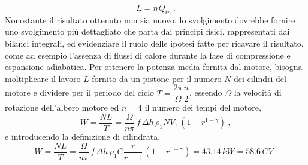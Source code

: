 \begin{equation}
  L = \eta \, Q_{in} \ .
\end{equation}
Nonostante il risultato ottenuto non sia nuovo, lo svolgimento dovrebbe fornire uno svolgimento più dettagliato che parta dai principi fisici, rappresentati dai bilanci integrali, ed evidenziare il ruolo delle ipotesi fatte per ricavare il risultato, come ad esempio l'assenza di flussi di calore durante la fase di compressione e espansione adiabatica. 
%
\newline \noindent
%
Per ottenere la potenza media fornita dal motore, bisogna moltiplicare il lavoro $L$ fornito da un pistone per il numero $N$ dei cilindri del motore e dividere per il periodo del ciclo $T = \dfrac{2 \pi}{\Omega} \dfrac{n}{2}$, essendo $\Omega$ la velocità di rotazione dell'albero motore ed $n = 4$ il numero dei tempi del motore,
\begin{equation}
 W = \dfrac{N L}{T} = \dfrac{\Omega }{n \pi} \, f \, \Delta h \, \rho_1 N V_1 \, \left( 1 - r^{1-\gamma} \right) \ ,
\end{equation}
e introducendo la definizione di cilindrata,
\begin{equation}
 W = \dfrac{N L}{T} = \dfrac{\Omega }{n \pi} \, f \, \Delta h \, \rho_1 C \dfrac{r}{r-1} \, \left( 1 - r^{1-\gamma} \right) = 43.14 \, kW = 58.6 \, CV \ .
\end{equation}
